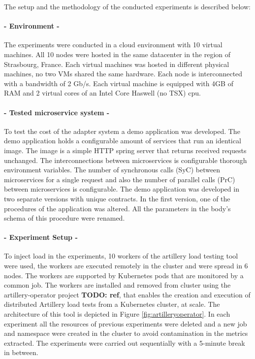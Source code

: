 The setup and the methodology of the conducted experiments is described below:

\paragraph{- Environment -}

The experiments were conducted in a cloud environment with 10 virtual machines.
All 10 nodes were hosted in the same datacenter in the region of Strasbourg, France.
Each virtual machines was hosted in different physical machines, no two VMs shared the same hardware.
Each node is interconnected with a bandwidth of 2 Gb/s.
Each virtual machine is equipped with 4GB of RAM and 2 virtual cores of an Intel Core Haswell (no TSX) cpu.

\paragraph{- Tested microservice system -}

To test the cost of the adapter system a demo application was developed.
The demo application holds a configurable amount of services that run an identical image.
The image is a simple HTTP spring server that returns received requests unchanged.
The interconnections between microservices is configurable thorough environment variables.
The number of synchronous calls (SyC) between microservices for a single request and also the number of parallel calls (PrC) between microservices is configurable.
The demo application was developed in two separate versions with unique contracts.
In the first version, one of the procedures of the application was altered.
All the parameters in the body's schema of this procedure were renamed.

\paragraph{- Experiment Setup -}

To inject load in the experiments, 10 workers of the artillery load testing tool were used,
the workers are executed remotely in the cluster and were spread in 6 nodes.
The workers are supported by Kubernetes pods that are monitored by a common job.
The workers are installed and removed from cluster using the artillery-operator project \textbf{TODO: ref}, that enables
the creation and execution of distributed Artillery load tests from a Kubernetes cluster, at scale.
The architecture of this tool is depicted in Figure \ref{fig:artilleryoperator}.
In each experiment all the resources of previous experiments were deleted and a new job and namespace were created in the
cluster to avoid contamination in the metrics extracted.
The experiments were carried out sequentially with a 5-minute break in between.

